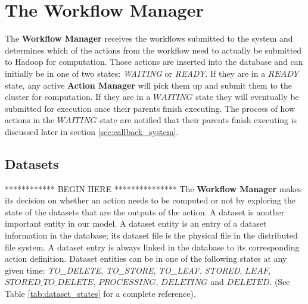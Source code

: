 \section{The Workflow Manager}
The \textbf{Workflow Manager} receives the workflows submitted to the system and determines which of the actions from the workflow need to actually be submitted to Hadoop for computation. Those actions are inserted into the database and can initially be in one of two states: \textit{WAITING} or \textit{READY}. If they are in a $READY$ state, any active \textbf{Action Manager} will pick them up and submit them to the cluster for computation. If they are in a $WAITING$ state they will eventually be submitted for execution once their parents finish executing. The process of how actions in the $WAITING$ state are notified that their parents finish executing is discussed later in section \ref{sec:callback_system}.

\subsection{Datasets}
************ BEGIN HERE ***************
The \textbf{Workflow Manager} makes its decision on whether an action needs to be computed or not by exploring the state of the datasets that are the outputs of the action. A dataset is another important entity in our model. A dataset entity is an entry of a dataset information in the database; its dataset file is the physical file in the distributed file system. A dataset entry is always linked in the database to its corresponding action definition. Dataset entities can be in one of the following states at any given time: \textit{TO\_DELETE}, \textit{TO\_STORE}, \textit{TO\_LEAF}, \textit{STORED}, $LEAF$, $STORED\_TO\_DELETE$, $PROCESSING$, $DELETING$ and $DELETED$. (See Table \ref{tab:dataset_states} for a complete reference).

